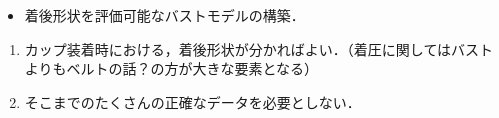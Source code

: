 \documentclass[11pt]{jsarticle}
\begin{document}
	\articleSPRabst
		\begin{itemize}
			\item 着後形状を評価可能なバストモデルの構築．
		\end{itemize}
		
		
	\articleSPRobj
		\begin{enumerate}
			\item カップ装着時における，着後形状が分かればよい．（着圧に関してはバストよりもベルトの話？の方が大きな要素となる）
			\item そこまでのたくさんの正確なデータを必要としない．
		\end{enumerate}
	\articleSPRitemsone
		
		\tableofcontents
		
		
	\articleSPRitemstwo
\end{document}
